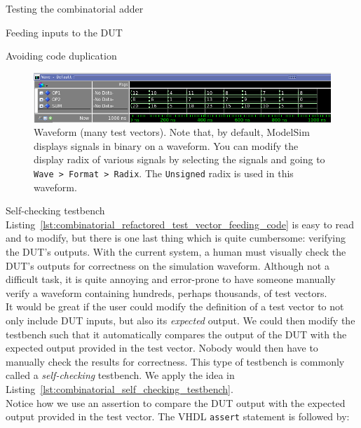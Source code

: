 \documentclass[lab]{course}
\begin{document}
\begin{section}{Testing the combinatorial adder}
\begin{subsection}{Feeding inputs to the DUT}
\begin{subsubsection}{Avoiding code duplication}
            \begin{figure}[!h]
                \begin{centering}
                    \includegraphics[width=1.0\textwidth]{figs/waveform_combinatorial_process_avoid_code_duplication.png}
                    \caption{Waveform (many test vectors). Note that, by default, ModelSim displays signals in binary on a waveform. You can modify the display radix of various signals by selecting the signals and going to \texttt{Wave > Format > Radix}. The \texttt{Unsigned} radix is used in this waveform.}
                    \label{fig:waveform_combinatorial_process_avoid_code_duplication}
                \end{centering}
            \end{figure}
        \end{subsubsection}

        \clearpage

        \begin{subsubsection}{Self-checking testbench}
            Listing~\ref{lst:combinatorial_refactored_test_vector_feeding_code} is easy to read and to modify, but there is one last thing which is quite cumbersome: verifying the DUT's outputs. With the current system, a human must visually check the DUT's outputs for correctness on the simulation waveform. Although not a difficult task, it is quite annoying and error-prone to have someone manually verify a waveform containing hundreds, perhaps thousands, of test vectors. \\

            It would be great if the user could modify the definition of a test vector to not only include DUT inputs, but also its \emph{expected} output. We could then modify the testbench such that it automatically compares the output of the DUT with the expected output provided in the test vector. Nobody would then have to manually check the results for correctness. This type of testbench is commonly called a \emph{self-checking} testbench. We apply the idea in Listing~\ref{lst:combinatorial_self_checking_testbench}. \\

            Notice how we use an assertion to compare the DUT output with the expected output provided in the test vector. The VHDL \verb+assert+ statement is followed by:


\end{subsubsection}
\end{subsection}
\end{section}
\end{document}
